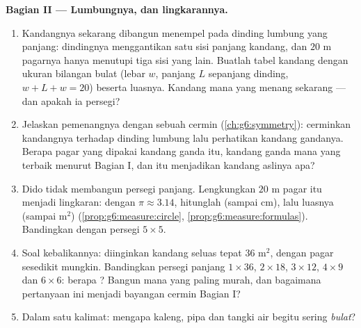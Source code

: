 \begin{problem}
\medskip
\noindent\textbf{Bagian II --- Lumbungnya, dan lingkarannya.}
\begin{enumerate}[resume]
  \item Kandangnya sekarang dibangun menempel pada dinding lumbung
        yang panjang: dindingnya menggantikan satu sisi panjang
        kandang, dan $20$ m pagarnya hanya menutupi tiga sisi yang
        lain. Buatlah tabel kandang dengan ukuran bilangan bulat
        (lebar $w$, panjang $L$ sepanjang dinding, $w + L + w = 20$)
        beserta luasnya. Kandang mana yang menang sekarang --- dan
        apakah ia persegi?
  \item Jelaskan pemenangnya dengan sebuah cermin
        (\cref{ch:g6:symmetry}): cerminkan kandangnya terhadap
        dinding lumbung lalu perhatikan kandang gandanya. Berapa
        pagar yang dipakai kandang ganda itu, kandang ganda mana yang
        terbaik menurut Bagian I, dan itu menjadikan kandang aslinya
        apa?
  \item Dido tidak membangun persegi panjang. Lengkungkan $20$ m
        pagar itu menjadi lingkaran: dengan $\pi \approx 3.14$,
        hitunglah  (sampai cm), lalu luasnya (sampai
        m$^2$) (\cref{prop:g6:measure:circle},
        \cref{prop:g6:measure:formulas}). Bandingkan dengan persegi
        $5 \times 5$.
  \item Soal kebalikannya: diinginkan kandang seluas tepat
        $36$ m$^2$, dengan pagar sesedikit mungkin. Bandingkan
        persegi panjang $1 \times 36$, $2 \times 18$, $3 \times 12$,
        $4 \times 9$ dan $6 \times 6$: berapa ? Bangun
        mana yang paling murah, dan bagaimana pertanyaan ini menjadi
        bayangan cermin Bagian I?
  \item Dalam satu kalimat: mengapa kaleng, pipa dan tangki air
        begitu sering \emph{bulat}?
\end{enumerate}


\end{problem}
